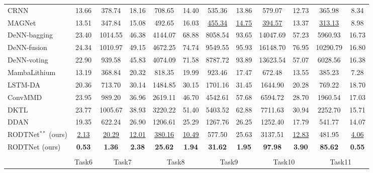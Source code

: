 \documentclass[lettersize,journal]{IEEEtran}
\begin{document}
\begin{table}[htbp]
{\begin{adjustbox}{center}
{\begin{threeparttable}
\begin{tabular}{lccccccccccc}
        CRNN \cite{D2EE01676A}  & 13.66  & 378.74  & 18.16  & 708.65  & 14.40  & 535.36  & 13.86  & 579.07  & 12.73  & 365.98  & 8.34  \\
        MAGNet \cite{TAN2024103725} & 13.51  & 347.84  & 15.08  & 492.65  & 16.03  & \underline{455.34}  & \underline{14.75}  & \underline{394.57}  & 13.37  & \underline{313.13}  & 8.98  \\
        DeNN-bagging \cite{10102497} & 23.40  & 1014.55  & 46.38  & 4144.07  & 68.88  & 8058.54  & 93.65  & 14047.69  & 57.23  & 5960.93  & 16.73  \\
        DeNN-fusion \cite{10102497} & 24.34  & 1010.97  & 49.15  & 4672.25  & 74.74  & 9549.55  & 95.93  & 16148.70  & 76.95  & 10290.79  & 16.80  \\
        DeNN-voting \cite{10102497} & 22.90  & 939.58  & 45.83  & 4074.09  & 71.58  & 8787.72  & 93.89  & 13623.54  & 57.07  & 6028.56  & 16.38  \\
        MambaLithium \cite{shi2024mambalithiumselectivestatespace} & 13.19  & 368.84  & 20.32  & 818.35  & 19.99  & 923.46  & 17.47  & 672.48  & 13.55  & 385.23  & 7.28  \\
        LSTM-DA \cite{HAN2022230823} & 20.36  & 713.70  & 30.14  & 1484.85  & 30.15  & 1701.16  & 31.45  & 1644.90  & 20.28  & 769.22  & 18.70  \\
        ConvMMD \cite{9788003} & 23.95  & 989.20  & 36.96  & 2619.11  & 46.70  & 4542.61  & 57.68  & 6594.72  & 28.70  & 1960.54  & 17.03  \\
        DKTL \cite{10029904}  & 23.77  & 1005.67  & 38.93  & 3220.22  & 51.40  & 5403.52  & 62.88  & 7711.63  & 30.94  & 2252.70  & 15.71  \\
        DDAN \cite{9560040}  & 19.35  & 622.24  & 26.90  & 1206.61  & 25.29  & 1267.76  & 26.25  & 1252.40  & 17.79  & 541.77  & 14.07  \\
        RODTNet$^{\ast\ast}$\tnote{b} {(ours)} & \underline{2.13}  & \underline{20.29}  & \underline{12.01}  & \underline{380.16}  & \underline{10.49}  & 577.50  & 25.63  & 3137.51  & \underline{12.83}  & 481.95  & \underline{4.06}  \\
        RODTNet (ours) & \textbf{0.53} & \textbf{1.36} & \textbf{2.38} & \textbf{25.62} & \textbf{1.94} & \textbf{31.62} & \textbf{1.95} & \textbf{97.98} & \textbf{3.90} & \textbf{85.62} & \textbf{0.55} \\
    \midrule
        \multicolumn{12}{c}{} \\
    \midrule
            & Task6 & \multicolumn{2}{c}{Task7} & \multicolumn{2}{c}{Task8} & \multicolumn{2}{c}{Task9} & \multicolumn{2}{c}{Task10} & \multicolumn{2}{c}{Task11} \\

\end{tabular}
\end{threeparttable}}
\end{adjustbox}}
\end{table}
\end{document}
